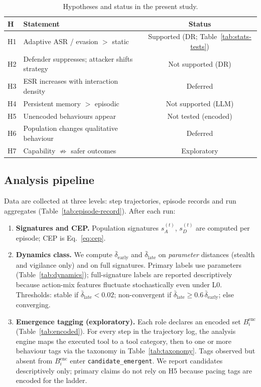 \begin{table}[!t]
\caption{Hypotheses and status in the present study.}
\label{tab:hyp}
\centering
\setlength{\tabcolsep}{2pt}
\small
\begin{tabularx}{\columnwidth}{@{}lXc@{}}
\toprule
\textbf{H} & \textbf{Statement} & \textbf{Status} \\
\midrule
H1 & Adaptive ASR / evasion $>$ static & Supported (DR; Table~\ref{tab:stats-tests}) \\
H2 & Defender suppresses; attacker shifts strategy & Not supported (DR) \\
H3 & ESR increases with interaction density & Deferred \\
H4 & Persistent memory $>$ episodic & Not supported (LLM) \\
H5 & Unencoded behaviours appear & Not tested (encoded) \\
H6 & Population changes qualitative behaviour & Deferred \\
H7 & Capability $\not\Rightarrow$ safer outcomes & Exploratory \\
\bottomrule
\end{tabularx}
\end{table}

\subsection{Analysis pipeline}
\label{sec:method-analysis}

Data are collected at three levels: step trajectories, episode records and
run aggregates (Table~\ref{tab:episode-record}). After each run:

\begin{enumerate}
\item \textbf{Signatures and CEP.} Population signatures $s_A^{(t)}$,
  $s_D^{(t)}$ are computed per episode; CEP is Eq.~\eqref{eq:cep}.
\item \textbf{Dynamics class.} We compute $\bar{\delta}_{\mathrm{early}}$ and
  $\bar{\delta}_{\mathrm{late}}$ on \emph{parameter} distances (stealth and
  vigilance only) and on full signatures. Primary labels use parameters
  (Table~\ref{tab:dynamics}); full-signature labels are reported descriptively
  because action-mix features fluctuate stochastically even under L0. Thresholds:
  stable if $\bar{\delta}_{\mathrm{late}}<0.02$; non-convergent if
  $\bar{\delta}_{\mathrm{late}}\ge 0.6\,\bar{\delta}_{\mathrm{early}}$; else
  converging.
\item \textbf{Emergence tagging (exploratory).} Each role declares an encoded set
  $B_i^{\mathrm{enc}}$ (Table~\ref{tab:encoded}). For every step in the
  trajectory log, the analysis engine maps the executed tool to a tool
  category, then to one or more behaviour tags via the taxonomy in
  Table~\ref{tab:taxonomy}. Tags observed but absent from $B_i^{\mathrm{enc}}$
  enter \texttt{candidate\_emergent}. We report candidates descriptively only;
  primary claims do not rely on H5 because pacing tags are encoded for the ladder.
\end{enumerate}

